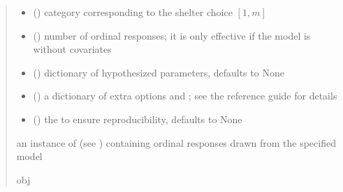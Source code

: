 \documentclass[letterpaper,10pt,english]{sphinxmanual}
\begin{document}
\begin{fulllineitems}
\begin{quote}
\begin{description}
\begin{itemize}
\item {} 
\sphinxAtStartPar
{} () \textendash{} category corresponding to the shelter choice \([1,m]\)

\item {} 
\sphinxAtStartPar
{} () \textendash{} number of ordinal responses; it is only effective if the model
is without covariates

\item {} 
\sphinxAtStartPar
{} (\sphinxstyleliteralemphasis{\sphinxupquote{, }}) \textendash{} dictionary of hypothesized parameters, defaults to None

\item {} 
\sphinxAtStartPar
{} () \textendash{} a dictionary of extra options  and ; see the reference
guide for details

\item {} 
\sphinxAtStartPar
{} (\sphinxstyleliteralemphasis{\sphinxupquote{, }}) \textendash{} the  to ensure reproducibility, defaults to None

\end{itemize}

\sphinxAtStartPar
an instance of  (see ) containing ordinal responses drawn from the specified model

\sphinxAtStartPar
obj

\end{description}\end{quote}

\end{fulllineitems}

\end{document}
